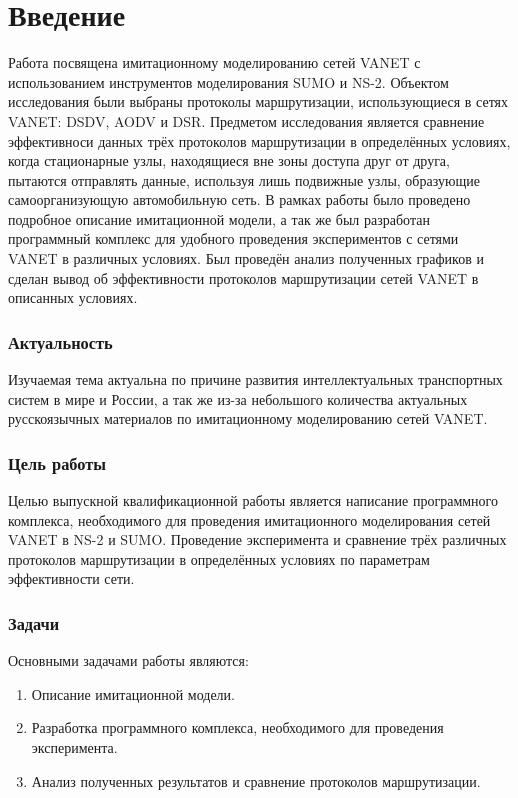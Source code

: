 \chapter*{Введение}

Работа посвящена имитационному моделированию сетей VANET с использованием инструментов моделирования SUMO и NS-2. 
Объектом исследования были выбраны протоколы маршрутизации, использующиеся в сетях VANET: DSDV, AODV и DSR. 
Предметом исследования является сравнение эффективноси данных трёх протоколов маршрутизации в определённых условиях, когда стационарные узлы, находящиеся вне зоны доступа друг от друга, пытаются отправлять данные, используя лишь подвижные узлы, образующие самоорганизующую автомобильную сеть. 
В рамках работы было проведено подробное описание имитационной модели, а так же был разработан программный комплекс для удобного проведения экспериментов с сетями VANET в различных условиях. Был проведён анализ полученных графиков и сделан вывод об эффективности протоколов маршрутизации сетей VANET в описанных условиях.

\subsection*{Актуальность}

Изучаемая тема актуальна по причине развития интеллектуальных транспортных систем в мире и России, а так же из-за небольшого количества актуальных русскоязычных материалов по имитационному моделированию сетей VANET.

\subsection*{Цель работы}

Целью выпускной квалификационной работы является написание программного комплекса, необходимого для проведения имитационного моделирования сетей VANET в NS-2 и SUMO. Проведение эксперимента и сравнение трёх различных протоколов маршрутизации в определённых условиях по параметрам эффективности сети.

\subsection*{Задачи}

Основными задачами работы являются:

\begin{enumerate}
    \item Описание имитационной модели.
    \item Разработка программного комплекса, необходимого для проведения эксперимента.
    \item Анализ полученных результатов и сравнение протоколов маршрутизации.
\end{enumerate}

